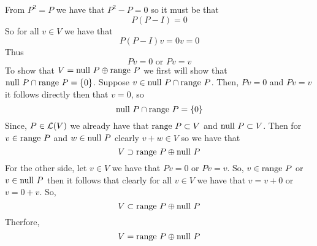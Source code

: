 \documentclass[10pt, twocolumn]{article}
\begin{document}
\begin{q}[4]
    From $ P^2 = P $ we have that $ P^2 - P = 0 $ so it must be that 
    $$ P(P - I) = 0 $$
    So for all $ v \in V $ we have that 
    $$ P(P - I)v = 0v = 0 $$
    Thus
    $$ Pv = 0 \text{ or } Pv = v $$
    To show that $ V = \text{null } P \oplus \text{range } P $ we first will show that $ \text{null } P \cap \text{range } P = \{0\} $.
    Suppose $ v \in \text{null } P \cap \text{range } P $. 
    Then, $ Pv = 0 $ and $ Pv = v $ it follows directly then that $ v = 0 $, so 
    $$ \text{null } P \cap \text{range } P = \{0\} $$
    Since, $ P \in \mathcal{L}(V) $ we already have that $ \text{range } P \subset V $ and $ \text{null } P \subset V $. 
    Then for $ v \in \text{range } P $ and $ w \in \text{null } P $ clearly $ v + w \in V $ so we have that 
    $$ V \supset \text{range } P \oplus \text{null } P $$
    For the other side, let $ v \in V $ we have that $ Pv = 0 $ or $ Pv = v $. 
    So, $ v \in \text{range } P $ or $ v \in \text{null } P $ then it follows that clearly for all $ v \in V $ we have that 
    $ v = v + 0 $ or $ v = 0 + v $. 
    So, 
    $$ V \subset \text{range } P \oplus \text{null } P $$
    Therfore,
    $$ V = \text{range } P \oplus \text{null } P $$
\end{q}
\end{document}
